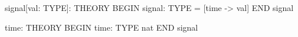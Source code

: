 signal[val: TYPE]: THEORY
  BEGIN
   signal: TYPE = [time -> val]
  END signal

time: THEORY
  BEGIN
   time: TYPE nat
  END signal

